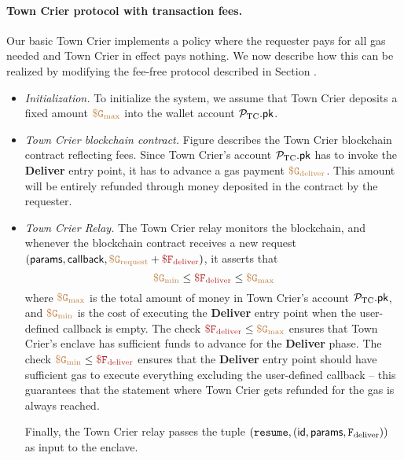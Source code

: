 \paragraph{Town Crier protocol with transaction fees.}
Our basic Town Crier implements a policy where the requester pays for all gas 
needed and Town Crier in effect pays nothing.
We now describe how this can be realized by modifying
the fee-free protocol described in Section . 

\begin{itemize}[leftmargin=5mm]
\item
{\it Initialization.}
To initialize the system, we assume that Town Crier 
deposits a fixed amount $\tt {\color{brown} \$ G_{\text{max}} }$ 
into the wallet account ${\mathcal{P}}_{\text{TC}}.{\sf pk}$.
\item
{\it Town Crier blockchain contract.}
Figure  describes the  
Town Crier blockchain contract reflecting fees.
Since Town Crier's account 
${\mathcal{P}}_{\text{TC}}.{\sf pk}$ has to invoke the {\bf Deliver} entry point, it has
to advance 
a gas payment 
$\tt {\color{brown} \$ G_{\text{deliver}} }$.
This amount will be entirely refunded through money deposited in the contract 
by the requester.
\item
{\it Town Crier Relay.}
The Town Crier relay monitors
the blockchain, and whenever
the blockchain contract \tcont
receives a new request $({\sf params}, {\sf callback}, 
\sbrown{\$ G_{\text{request}}}+\smaroon{\$ F_{\text{deliver}}})$,
it asserts that 
\[
\sbrown{\$ G_{\text{min}}}
\leq \smaroon{\$ F_{\text{deliver}}} \leq \sbrown{\$ G_{\text{max}}}
\]
where $\tt {\color{brown} \$ G_{\text{max}} }$ is the total amount of money
in Town Crier's account ${\mathcal{P}}_{\text{TC}}.{\sf pk}$, 
and $\tt {\color{brown} \$ G_{\text{min}} }$
is the cost of executing the {\bf Deliver} entry point 
when the user-defined callback is empty.
The check 
$\smaroon{\$ F_{\text{deliver}}} \leq \sbrown{\$ G_{\text{max}}}$
ensures that Town Crier's enclave  
has sufficient funds to advance
for the {\bf Deliver} phase.
The check 
$\sbrown{\$ G_{\text{min}}}
\leq \smaroon{\$ F_{\text{deliver}}}$
ensures that 
the {\bf Deliver} entry point should 
have sufficient gas to execute everything excluding the user-defined
callback -- this guarantees that the statement
where Town Crier gets refunded for the gas is always reached.


Finally, the Town Crier relay passes
the tuple $({\tt resume}, 
({\sf id}, {\sf params}, 
{\tt F_{\text{deliver}}}
))$
as input to the enclave.



\end{itemize}

